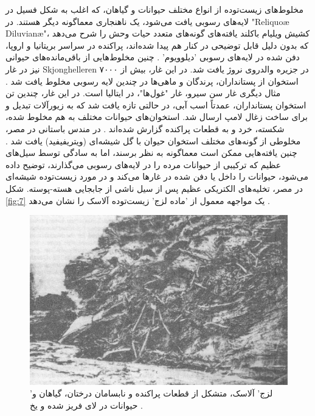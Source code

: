 \documentclass[10pt,twocolumn,letterpaper]{article}
\begin{document}
مخلوط‌های زیست‌توده از انواع مختلف حیوانات و گیاهان، که اغلب به شکل فسیل در لایه‌های رسوبی یافت می‌شود، یک ناهنجاری معماگونه دیگر هستند. در "Reliquoæ Diluvianæ"، کشیش ویلیام باکلند یافته‌های گونه‌های متعدد حیات وحش را شرح می‌دهد که بدون دلیل قابل توضیحی در کنار هم پیدا شده‌اند، پراکنده در سراسر بریتانیا و اروپا، دفن شده در لایه‌های رسوبی 'دیلوویوم' \cite{58}. چنین مخلوط‌هایی از باقی‌مانده‌های حیوانی نیز در غار Skjonghelleren در جزیره والدروی نروژ یافت شد. در این غار، بیش از ۷۰۰۰ استخوان از پستانداران، پرندگان و ماهی‌ها در چندین لایه رسوبی مخلوط یافت شد \cite{59}. مثال دیگری غار سن سیرو، غار "غول‌ها"، در ایتالیا است. در این غار، چندین تن استخوان پستانداران، عمدتاً اسب آبی، در حالتی تازه یافت شد که به زیورآلات تبدیل و برای ساخت زغال لامپ ارسال شد. استخوان‌های حیوانات مختلف به هم مخلوط شده، شکسته، خرد و به قطعات پراکنده گزارش شده‌اند \cite{60,61}. در مندس باستانی در مصر، مخلوطی از گونه‌های مختلف استخوان حیوان با گل شیشه‌ای (ویتریفیفید) یافت شد \cite{57}. چنین یافته‌هایی ممکن است معماگونه به نظر برسند، اما به سادگی توسط سیل‌های عظیم که ترکیبی از حیوانات مرده را در لایه‌های رسوبی می‌گذارند، توضیح داده می‌شود، حیوانات را داخل یا دفن شده در غارها می‌کند و در مورد زیست‌توده شیشه‌ای در مصر، تخلیه‌های الکتریکی عظیم پس از سیل ناشی از جابجایی هسته-پوسته. شکل \ref{fig:7} یک مواجهه‌ معمول از 'ماده لزج' زیست‌توده آلاسک را نشان می‌دهد \cite{56}.

\begin{figure}[t]
\begin{center}
   \includegraphics[width=1\linewidth]{muck-crop.jpeg}
\end{center}
   \caption{'لزج' آلاسک، متشکل از قطعات پراکنده و نابسامان درختان، گیاهان و حیوانات در لای فریز شده و یخ \cite{146}.}
\label{fig:7}
\label{fig:onecol}
\end{figure}
\end{document}

